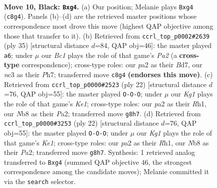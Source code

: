 \documentclass[11pt]{article}
\begin{document}
\clearpage

\begin{figure}[p]\centering
\begin{subfigure}{0.46\textwidth}\centering
\resizebox{\linewidth}{!}{%
\newchessgame
\chessboard[
  setfen={rnbq1rk1/ppp2pp1/5b1p/4P3/2p3PP/2N1PN2/PP3P2/R2QKB1R b KQ - 0 10},
  showmover=false,
  pgfstyle=straightmove, color=movearrow, markmove={c8-g4}
]}
\caption{}
\end{subfigure}\hfill
\begin{subfigure}{0.46\textwidth}\centering
\resizebox{\linewidth}{!}{%
\newchessgame
\chessboard[
  setfen={r2r2k1/pppb1p1p/4pb2/2Pq1p2/PP1P4/3BQN2/5PPP/R2R2K1 b - - 2 18},
  showmover=false,
  pgfstyle=straightmove, color=movearrow, markmove={a7-a6}
]}
\caption{}
\end{subfigure}
\\[4pt]
\begin{subfigure}{0.46\textwidth}\centering
\resizebox{\linewidth}{!}{%
\newchessgame
\chessboard[
  setfen={rnbqkb1r/1p3p1p/p4n2/4pPP1/3p4/2N1BQ2/PPP2P1P/R3KB1R w KQkq - 0 12},
  showmover=false,
  pgfstyle=straightmove, color=movearrow, markmove={e1-c1}
]}
\caption{}
\end{subfigure}\hfill
\begin{subfigure}{0.46\textwidth}\centering
\resizebox{\linewidth}{!}{%
\newchessgame
\chessboard[
  setfen={rnbqkb1r/1p3p1p/p4n2/4pPP1/3p4/2N1BQ2/PPP2P1P/R3KB1R w KQkq - 0 12},
  showmover=false,
  pgfstyle=straightmove, color=movearrow, markmove={e1-c1}
]}
\caption{}
\end{subfigure}
\caption{\textbf{Move 10, Black: \texttt{Bxg4}.} (a) Our position; Melanie plays \texttt{Bxg4} (\texttt{c8g4}). Panels (b)--(d) are the retrieved master positions whose correspondence most drove this move (highest QAP objective among those that transfer to it). (b) Retrieved from \texttt{ccrl\_top\_p0002\#2639} (ply 35) [structural distance $d$=84, QAP obj=46]: the master played \texttt{a6}; under $\mu$ our \emph{Bc1} plays the role of that game's \emph{Pa2} (a \textbf{cross-type} correspondence); cross-type roles: our \emph{p}a2 as their \emph{B}d7, our \emph{n}c3 as their \emph{P}h7; transferred move \texttt{c8g4} \textbf{(endorses this move)}. (c) Retrieved from \texttt{ccrl\_top\_p0000\#2523} (ply 22) [structural distance $d$=76, QAP obj=55]: the master played \texttt{O-O-O}; under $\mu$ our \emph{Kg1} plays the role of that game's \emph{Ke1}; cross-type roles: our \emph{p}a2 as their \emph{R}h1, our \emph{N}b8 as their \emph{P}a2; transferred move \texttt{g8h7}. (d) Retrieved from \texttt{ccrl\_top\_p0000\#3253} (ply 22) [structural distance $d$=76, QAP obj=55]: the master played \texttt{O-O-O}; under $\mu$ our \emph{Kg1} plays the role of that game's \emph{Ke1}; cross-type roles: our \emph{p}a2 as their \emph{R}h1, our \emph{N}b8 as their \emph{P}a2; transferred move \texttt{g8h7}. Synthesis: 1 retrieved analog transferred to \texttt{Bxg4} (summed QAP objective 46, the strongest correspondence among the candidate moves); Melanie committed it via the \texttt{search} selector.}
\label{fig:thought-m19}
\end{figure}
\end{document}

